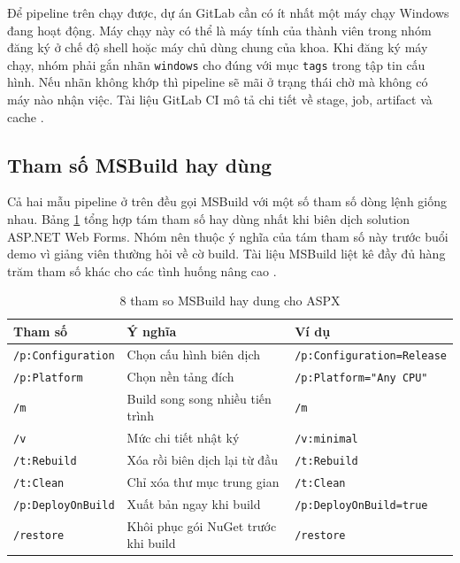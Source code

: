 Để pipeline trên chạy được, dự án GitLab cần có ít nhất một máy chạy Windows đang hoạt động.
Máy chạy này có thể là máy tính của thành viên trong nhóm đăng ký ở chế độ shell hoặc máy chủ dùng chung của khoa.
Khi đăng ký máy chạy, nhóm phải gắn nhãn \verb|windows| cho đúng với mục \verb|tags| trong tập tin cấu hình.
Nếu nhãn không khớp thì pipeline sẽ mãi ở trạng thái chờ mà không có máy nào nhận việc.
Tài liệu GitLab CI mô tả chi tiết về stage, job, artifact và cache \cite{gitlabci,gitlabdocs}.

\subsection{Tham số MSBuild hay dùng}
\label{subsec:pc-msbuild}

Cả hai mẫu pipeline ở trên đều gọi MSBuild với một số tham số dòng lệnh giống nhau.
Bảng \ref{tab:pc-msbuild} tổng hợp tám tham số hay dùng nhất khi biên dịch solution ASP.NET Web Forms.
Nhóm nên thuộc ý nghĩa của tám tham số này trước buổi demo vì giảng viên thường hỏi về cờ build.
Tài liệu MSBuild liệt kê đầy đủ hàng trăm tham số khác cho các tình huống nâng cao \cite{msmsbuild}.

\begin{table}[H]
\centering
\caption{8 tham so MSBuild hay dung cho ASPX}
\label{tab:pc-msbuild}
\begin{tabular}{lll}
\toprule
Tham số & Ý nghĩa & Ví dụ \\
\midrule
\texttt{/p:Configuration} & Chọn cấu hình biên dịch & \texttt{/p:Configuration=Release} \\
\texttt{/p:Platform} & Chọn nền tảng đích & \texttt{/p:Platform="Any CPU"} \\
\texttt{/m} & Build song song nhiều tiến trình & \texttt{/m} \\
\texttt{/v} & Mức chi tiết nhật ký & \texttt{/v:minimal} \\
\texttt{/t:Rebuild} & Xóa rồi biên dịch lại từ đầu & \texttt{/t:Rebuild} \\
\texttt{/t:Clean} & Chỉ xóa thư mục trung gian & \texttt{/t:Clean} \\
\texttt{/p:DeployOnBuild} & Xuất bản ngay khi build & \texttt{/p:DeployOnBuild=true} \\
\texttt{/restore} & Khôi phục gói NuGet trước khi build & \texttt{/restore} \\
\bottomrule
\end{tabular}
\end{table}

